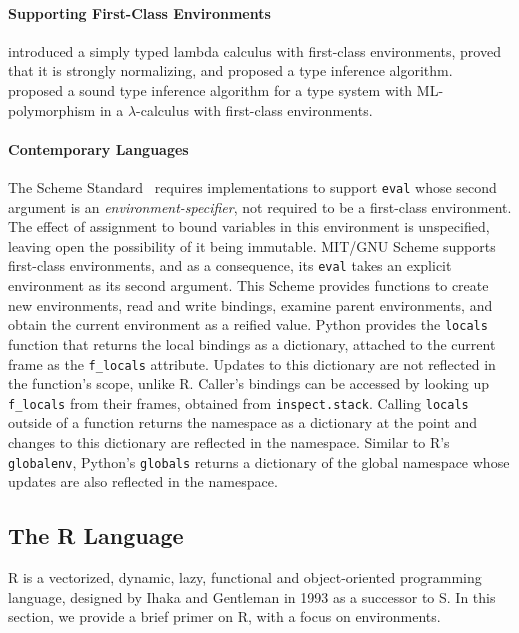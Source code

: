 \documentclass[10pt,review,sigplan,anonymous=true,authorversion=true,nonacm=true]{acmart}
\newcommand{\code}[1]{\lstinline |#1|\xspace}
\begin{document}
\paragraph{Supporting First-Class Environments} \citet{NishizakiSTLC94}
introduced a simply typed lambda calculus with first-class environments, proved
that it is strongly normalizing, and proposed a type inference algorithm.
\citet{NishizakiML94} proposed a sound type inference algorithm for a type
system with ML-polymorphism in a $\lambda$-calculus with first-class
environments.


\paragraph{Contemporary Languages} The Scheme Standard~\cite{SchemeR5RS}
requires implementations to support \code{eval} whose second argument is an
\emph{environment-specifier}, not required to be a first-class environment. The
effect of assignment to bound variables in this environment is unspecified,
leaving open the possibility of it being immutable. MIT/GNU Scheme supports
first-class environments, and as a consequence, its \code{eval} takes an
explicit environment as its second argument. This Scheme provides functions to
create new environments, read and write bindings, examine parent environments,
and obtain the current environment as a reified value. Python provides the
\code{locals} function that returns the local bindings as a dictionary, attached
to the current frame as the \code{f_locals} attribute. Updates to this
dictionary are not reflected in the function's scope, unlike R. Caller's
bindings can be accessed by looking up \code{f_locals} from their frames,
obtained from \code{inspect.stack}. Calling \code{locals} outside of a function
returns the namespace as a dictionary at the point and changes to this
dictionary are reflected in the namespace. Similar to R's \code{globalenv},
Python's \code{globals} returns a dictionary of the global namespace whose
updates are also reflected in the namespace.

\subsection{The R Language}

R is a vectorized, dynamic, lazy, functional and object-oriented programming
language, designed by Ihaka and Gentleman in 1993 as a successor to S. In this
section, we provide a brief primer on R, with a focus on environments.
\end{document}
